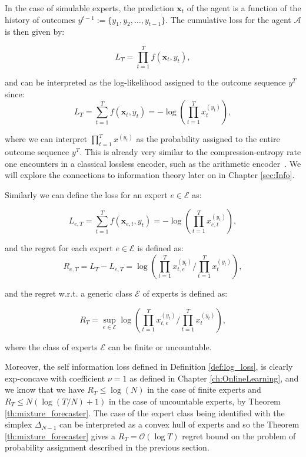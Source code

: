 In the case of simulable experts, the prediction $\mathbf x_t$ of the agent is a function of the history of outcomes $y^{t-1}:=\{y_1,y_2,\ldots,y_{t-1}\}$.
The cumulative loss for the agent $\mathcal A$ is then given by:

\begin{equation}
L_T=\prod\limits_{t=1}^T f(\mathbf x_t,y_t),
\end{equation}

and can be interpreted as the log-likelihood assigned to the outcome sequence $y^T$ since:
\begin{equation}\label{eq:loss_log}
L_T=\sum\limits_{t=1}^Tf(\mathbf x_t,y_t)=-\log\left(\prod\limits_{t=1}^T x_t^{(y_t)}\right),
\end{equation}

where we can interpret $\prod\limits_{t=1}^Tx^{(y_t)}$ as the probability assigned to the entire outcome sequence $y^T$. This is already very similar to the compression-entropy rate one encounters in a classical lossless encoder, such as the arithmetic encoder~\cite{langdon1984introduction}. We will explore the connections to information theory later on in Chapter \ref{sec:Info}.

Similarly we can define the loss for an expert $e\in\mathcal E$ as: 

\begin{equation}
L_{e,T}=\sum\limits_{t=1}^Tf(\mathbf x_{e,t},y_t)=-\log\left(\prod\limits_{t=1}^Tx_{e,t}^{(y_t)}\right),
\end{equation}

and the regret for each expert $e\in\mathcal E$ is defined as:
\begin{equation}
R_{e,T}=L_T-L_{e,T}=\log\left(\prod\limits_{t=1}^Tx_{t,e}^{(y_t)}\bigg/\prod\limits_{t=1}^Tx_t^{(y_t)}\right),
\end{equation}

and the regret w.r.t. a generic class $\mathcal E$ of experts is defined as: 

\begin{equation}
R_{T}=\sup\limits_{e\in\mathcal E}\log\left(\prod\limits_{t=1}^Tx_{t,e}^{(y_t)}\bigg/\prod\limits_{t=1}^Tx_t^{(y_t)}\right),
\end{equation}

where the class of experts $\mathcal E$ can be finite or uncountable.

Moreover, the self information loss defined in Definition \ref{def:log_loss}, is clearly exp-concave with coefficient $\nu=1$ as defined in Chapter \ref{ch:OnlineLearning}, and we know that we have $R_T\le\log(N)$ in the case of finite experts and $R_T\le N(\log(T/N)+1)$ in the case of uncountable experts, by Theorem \ref{th:mixture_forecaster}. The case of the expert class being identified with the simplex $\Delta_{N-1}$ can be interpreted as a convex hull of experts and so the Theorem \ref{th:mixture_forecaster} gives a $R_T=\mathcal O(\log T)$ regret bound on the problem of probability assignment described in the previous section.

